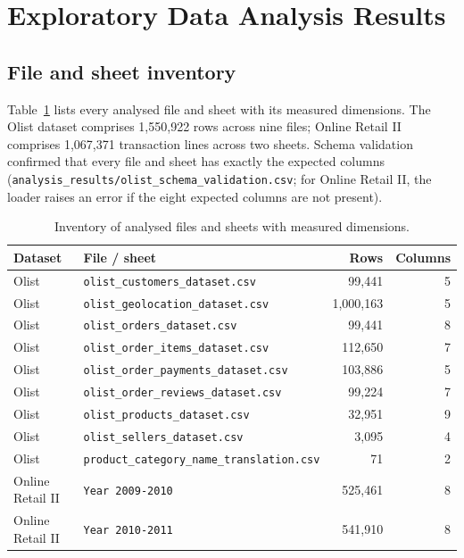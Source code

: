 \documentclass[11pt,a4paper]{article}
\newcommand{\code}[1]{\texttt{#1}}
\begin{document}
\section{Exploratory Data Analysis Results}
\subsection{File and sheet inventory}
Table~\ref{tab:inventory} lists every analysed file and sheet with its measured dimensions. The Olist dataset comprises 1{,}550{,}922 rows across nine files; Online Retail II comprises 1{,}067{,}371 transaction lines across two sheets. Schema validation confirmed that every file and sheet has exactly the expected columns (\code{analysis\_results/olist\_schema\_validation.csv}; for Online Retail II, the loader raises an error if the eight expected columns are not present).

\begin{table}[H]
\centering
\small
\caption{Inventory of analysed files and sheets with measured dimensions.}
\label{tab:inventory}
\begin{tabular}{llrr}
\toprule
\textbf{Dataset} & \textbf{File / sheet} & \textbf{Rows} & \textbf{Columns} \\
\midrule
Olist & \code{olist\_customers\_dataset.csv} & 99{,}441 & 5 \\
Olist & \code{olist\_geolocation\_dataset.csv} & 1{,}000{,}163 & 5 \\
Olist & \code{olist\_orders\_dataset.csv} & 99{,}441 & 8 \\
Olist & \code{olist\_order\_items\_dataset.csv} & 112{,}650 & 7 \\
Olist & \code{olist\_order\_payments\_dataset.csv} & 103{,}886 & 5 \\
Olist & \code{olist\_order\_reviews\_dataset.csv} & 99{,}224 & 7 \\
Olist & \code{olist\_products\_dataset.csv} & 32{,}951 & 9 \\
Olist & \code{olist\_sellers\_dataset.csv} & 3{,}095 & 4 \\
Olist & \code{product\_category\_name\_translation.csv} & 71 & 2 \\
Online Retail II & \code{Year 2009-2010} & 525{,}461 & 8 \\
Online Retail II & \code{Year 2010-2011} & 541{,}910 & 8 \\
\bottomrule
\end{tabular}
\end{table}
\end{document}
